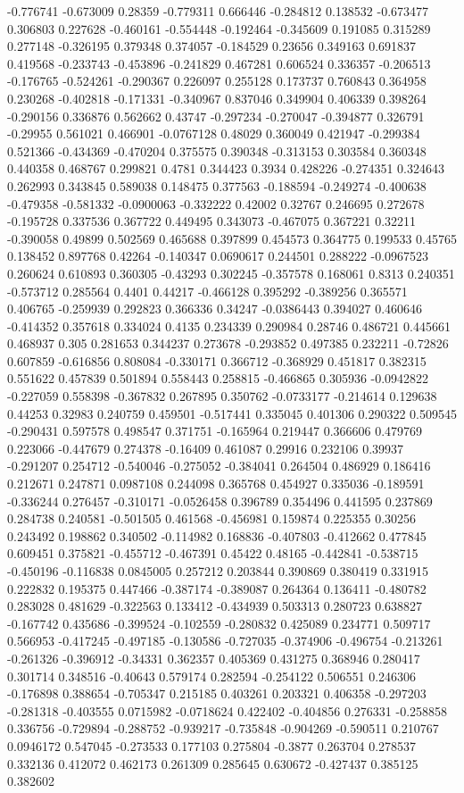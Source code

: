 -0.776741 -0.673009 0.28359 -0.779311 0.666446 -0.284812 0.138532 -0.673477 0.306803 0.227628 -0.460161 -0.554448 -0.192464 -0.345609 0.191085 0.315289 0.277148 -0.326195 0.379348 0.374057 -0.184529 0.23656 0.349163 0.691837 0.419568 -0.233743 -0.453896 -0.241829 0.467281 0.606524 0.336357 -0.206513 -0.176765 -0.524261 -0.290367 0.226097 0.255128 0.173737 0.760843 0.364958 0.230268 -0.402818 -0.171331 -0.340967 0.837046 0.349904 0.406339 0.398264 -0.290156 0.336876 0.562662 0.43747 -0.297234 -0.270047 -0.394877 0.326791 -0.29955 0.561021 0.466901 -0.0767128 0.48029 0.360049 0.421947 -0.299384 0.521366 -0.434369 -0.470204 0.375575 0.390348 -0.313153 0.303584 0.360348 0.440358 0.468767 0.299821 0.4781 0.344423 0.3934 0.428226 -0.274351 0.324643 0.262993 0.343845 0.589038 0.148475 0.377563 -0.188594 -0.249274 -0.400638 -0.479358 -0.581332 -0.0900063 -0.332222 0.42002 0.32767 0.246695 0.272678 -0.195728 0.337536 0.367722 0.449495 0.343073 -0.467075 0.367221 0.32211 -0.390058 0.49899 0.502569 0.465688 0.397899 0.454573 0.364775 0.199533 0.45765 0.138452 0.897768 0.42264 -0.140347 0.0690617 0.244501 0.288222 -0.0967523 0.260624 0.610893 0.360305 -0.43293 0.302245 -0.357578 0.168061 0.8313 0.240351 -0.573712 0.285564 0.4401 0.44217 -0.466128 0.395292 -0.389256 0.365571 0.406765 -0.259939 0.292823 0.366336 0.34247 -0.0386443 0.394027 0.460646 -0.414352 0.357618 0.334024 0.4135 0.234339 0.290984 0.28746 0.486721 0.445661 0.468937 0.305 0.281653 0.344237 0.273678 -0.293852 0.497385 0.232211 -0.72826 0.607859 -0.616856 0.808084 -0.330171 0.366712 -0.368929 0.451817 0.382315 0.551622 0.457839 0.501894 0.558443 0.258815 -0.466865 0.305936 -0.0942822 -0.227059 0.558398 -0.367832 0.267895 0.350762 -0.0733177 -0.214614 0.129638 0.44253 0.32983 0.240759 0.459501 -0.517441 0.335045 0.401306 0.290322 0.509545 -0.290431 0.597578 0.498547 0.371751 -0.165964 0.219447 0.366606 0.479769 0.223066 -0.447679 0.274378 -0.16409 0.461087 0.29916 0.232106 0.39937 -0.291207 0.254712 -0.540046 -0.275052 -0.384041 0.264504 0.486929 0.186416 0.212671 0.247871 0.0987108 0.244098 0.365768 0.454927 0.335036 -0.189591 -0.336244 0.276457 -0.310171 -0.0526458 0.396789 0.354496 0.441595 0.237869 0.284738 0.240581 -0.501505 0.461568 -0.456981 0.159874 0.225355 0.30256 0.243492 0.198862 0.340502 -0.114982 0.168836 -0.407803 -0.412662 0.477845 0.609451 0.375821 -0.455712 -0.467391 0.45422 0.48165 -0.442841 -0.538715 -0.450196 -0.116838 0.0845005 0.257212 0.203844 0.390869 0.380419 0.331915 0.222832 0.195375 0.447466 -0.387174 -0.389087 0.264364 0.136411 -0.480782 0.283028 0.481629 -0.322563 0.133412 -0.434939 0.503313 0.280723 0.638827 -0.167742 0.435686 -0.399524 -0.102559 -0.280832 0.425089 0.234771 0.509717 0.566953 -0.417245 -0.497185 -0.130586 -0.727035 -0.374906 -0.496754 -0.213261 -0.261326 -0.396912 -0.34331 0.362357 0.405369 0.431275 0.368946 0.280417 0.301714 0.348516 -0.40643 0.579174 0.282594 -0.254122 0.506551 0.246306 -0.176898 0.388654 -0.705347 0.215185 0.403261 0.203321 0.406358 -0.297203 -0.281318 -0.403555 0.0715982 -0.0718624 0.422402 -0.404856 0.276331 -0.258858 0.336756 -0.729894 -0.288752 -0.939217 -0.735848 -0.904269 -0.590511 0.210767 0.0946172 0.547045 -0.273533 0.177103 0.275804 -0.3877 0.263704 0.278537 0.332136 0.412072 0.462173 0.261309 0.285645 0.630672 -0.427437 0.385125 0.382602 